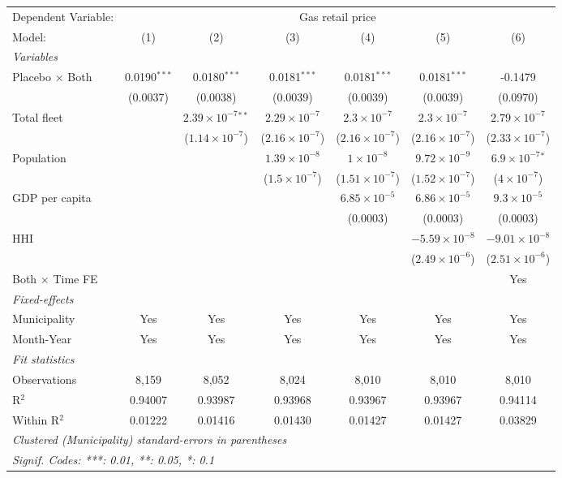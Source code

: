 \documentclass[
]{article}
\begin{document}
\begin{tabular}{lcccccc}
\tabularnewline\midrule\midrule
Dependent Variable:&\multicolumn{6}{c}{Gas retail price}\\
Model:&(1) & (2) & (3) & (4) & (5) & (6)\\
\midrule \emph{Variables}&   &   &   &   &   &  \\
Placebo $\times $ Both & 0.0190$^{***}$ & 0.0180$^{***}$ & 0.0181$^{***}$ & 0.0181$^{***}$ & 0.0181$^{***}$ & -0.1479\\
  &(0.0037) & (0.0038) & (0.0039) & (0.0039) & (0.0039) & (0.0970)\\
Total fleet &    & $2.39\times 10^{-7}$$^{**}$ & $2.29\times 10^{-7}$ & $2.3\times 10^{-7}$ & $2.3\times 10^{-7}$ & $2.79\times 10^{-7}$\\
  &   & ($1.14\times 10^{-7}$) & ($2.16\times 10^{-7}$) & ($2.16\times 10^{-7}$) & ($2.16\times 10^{-7}$) & ($2.33\times 10^{-7}$)\\
Population &    &    & $1.39\times 10^{-8}$ & $1\times 10^{-8}$ & $9.72\times 10^{-9}$ & $6.9\times 10^{-7}$$^{*}$\\
  &   &    & ($1.5\times 10^{-7}$) & ($1.51\times 10^{-7}$) & ($1.52\times 10^{-7}$) & ($4\times 10^{-7}$)\\
GDP per capita &    &    &    & $6.85\times 10^{-5}$ & $6.86\times 10^{-5}$ & $9.3\times 10^{-5}$\\
  &   &    &    & (0.0003) & (0.0003) & (0.0003)\\
HHI &    &    &    &    & $-5.59\times 10^{-8}$ & $-9.01\times 10^{-8}$\\
  &   &    &    &    & ($2.49\times 10^{-6}$) & ($2.51\times 10^{-6}$)\\
Both $\times$ Time FE &  &  &  &  &  & Yes\\
\midrule \emph{Fixed-effects}&   &   &   &   &   &  \\
Municipality & Yes & Yes & Yes & Yes & Yes & Yes\\
Month-Year & Yes & Yes & Yes & Yes & Yes & Yes\\
\midrule \emph{Fit statistics}&  & & & & & \\
Observations & 8,159&8,052&8,024&8,010&8,010&8,010\\
R$^2$ & 0.94007&0.93987&0.93968&0.93967&0.93967&0.94114\\
Within R$^2$ & 0.01222&0.01416&0.01430&0.01427&0.01427&0.03829\\
\midrule\midrule\multicolumn{7}{l}{\emph{Clustered (Municipality) standard-errors in parentheses}}\\
\multicolumn{7}{l}{\emph{Signif. Codes: ***: 0.01, **: 0.05, *: 0.1}}\\
\end{tabular}
\end{document}
